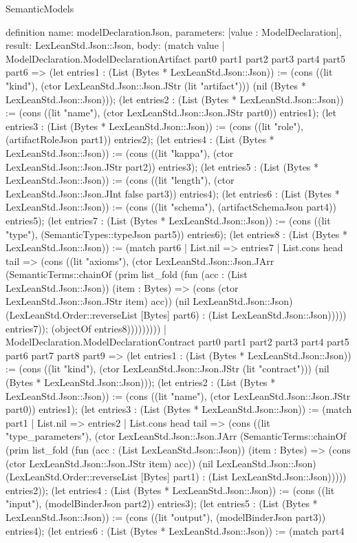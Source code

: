 \begin{lexlean}{SemanticModels}
\begin{semanticmodule}
definition{
  name: modelDeclarationJson,
  parameters: [value : ModelDeclaration],
  result: LexLeanStd.Json::Json,
  body: (match value
    | ModelDeclaration.ModelDeclarationArtifact part0 part1 part2 part3 part4 part5 part6 => (let entries1 : (List (Bytes * LexLeanStd.Json::Json)) := (cons ((lit "kind"), (ctor LexLeanStd.Json::Json.JStr (lit "artifact"))) (nil (Bytes * LexLeanStd.Json::Json))); (let entries2 : (List (Bytes * LexLeanStd.Json::Json)) := (cons ((lit "name"), (ctor LexLeanStd.Json::Json.JStr part0)) entries1); (let entries3 : (List (Bytes * LexLeanStd.Json::Json)) := (cons ((lit "role"), (artifactRoleJson part1)) entries2); (let entries4 : (List (Bytes * LexLeanStd.Json::Json)) := (cons ((lit "kappa"), (ctor LexLeanStd.Json::Json.JStr part2)) entries3); (let entries5 : (List (Bytes * LexLeanStd.Json::Json)) := (cons ((lit "length"), (ctor LexLeanStd.Json::Json.JInt false part3)) entries4); (let entries6 : (List (Bytes * LexLeanStd.Json::Json)) := (cons ((lit "schema"), (artifactSchemaJson part4)) entries5); (let entries7 : (List (Bytes * LexLeanStd.Json::Json)) := (cons ((lit "type"), (SemanticTypes::typeJson part5)) entries6); (let entries8 : (List (Bytes * LexLeanStd.Json::Json)) := (match part6
      | List.nil => entries7
      | List.cons head tail => (cons ((lit "axioms"), (ctor LexLeanStd.Json::Json.JArr (SemanticTerms::chainOf (prim list_fold (fun (acc : (List LexLeanStd.Json::Json)) (item : Bytes) => (cons (ctor LexLeanStd.Json::Json.JStr item) acc)) (nil LexLeanStd.Json::Json) (LexLeanStd.Order::reverseList [Bytes] part6) : (List LexLeanStd.Json::Json))))) entries7)); (objectOf entries8)))))))))
    | ModelDeclaration.ModelDeclarationContract part0 part1 part2 part3 part4 part5 part6 part7 part8 part9 => (let entries1 : (List (Bytes * LexLeanStd.Json::Json)) := (cons ((lit "kind"), (ctor LexLeanStd.Json::Json.JStr (lit "contract"))) (nil (Bytes * LexLeanStd.Json::Json))); (let entries2 : (List (Bytes * LexLeanStd.Json::Json)) := (cons ((lit "name"), (ctor LexLeanStd.Json::Json.JStr part0)) entries1); (let entries3 : (List (Bytes * LexLeanStd.Json::Json)) := (match part1
      | List.nil => entries2
      | List.cons head tail => (cons ((lit "type_parameters"), (ctor LexLeanStd.Json::Json.JArr (SemanticTerms::chainOf (prim list_fold (fun (acc : (List LexLeanStd.Json::Json)) (item : Bytes) => (cons (ctor LexLeanStd.Json::Json.JStr item) acc)) (nil LexLeanStd.Json::Json) (LexLeanStd.Order::reverseList [Bytes] part1) : (List LexLeanStd.Json::Json))))) entries2)); (let entries4 : (List (Bytes * LexLeanStd.Json::Json)) := (cons ((lit "input"), (modelBinderJson part2)) entries3); (let entries5 : (List (Bytes * LexLeanStd.Json::Json)) := (cons ((lit "output"), (modelBinderJson part3)) entries4); (let entries6 : (List (Bytes * LexLeanStd.Json::Json)) := (match part4
}
\end{semanticmodule}
\end{lexlean}
